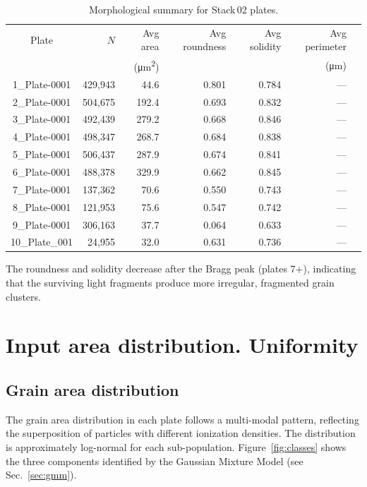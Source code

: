 \documentclass[12pt,a4paper]{article}
\begin{document}
\begin{table}[H]
\centering
\caption{Morphological summary for Stack\,02 plates.}
\label{tab:morph}
\begin{tabular}{crrrrrc}
\toprule
Plate & $N$ & Avg area & Avg roundness & Avg solidity &
Avg perimeter \\
 & & (\si{\micro\meter\squared}) & & & (\si{\micro\meter}) \\
\midrule
1\_Plate-0001 & 429,943 & 44.6 & 0.801 & 0.784 & --- \\
2\_Plate-0001 & 504,675 & 192.4 & 0.693 & 0.832 & --- \\
3\_Plate-0001 & 492,439 & 279.2 & 0.668 & 0.846 & --- \\
4\_Plate-0001 & 498,347 & 268.7 & 0.684 & 0.838 & --- \\
5\_Plate-0001 & 506,437 & 287.9 & 0.674 & 0.841 & --- \\
6\_Plate-0001 & 488,378 & 329.9 & 0.662 & 0.845 & --- \\
7\_Plate-0001 & 137,362 & 70.6 & 0.550 & 0.743 & --- \\
8\_Plate-0001 & 121,953 & 75.6 & 0.547 & 0.742 & --- \\
9\_Plate-0001 & 306,163 & 37.7 & 0.064 & 0.633 & --- \\
10\_Plate\_001 & 24,955 & 32.0 & 0.631 & 0.736 & --- \\
\bottomrule
\end{tabular}
\end{table}

The roundness and solidity decrease after the Bragg peak (plates 7+),
indicating that the surviving light fragments produce more irregular,
fragmented grain clusters.

\section{Input area distribution. Uniformity}
\label{sec:uniformity}

\subsection{Grain area distribution}

The grain area distribution in each plate follows a multi-modal pattern,
reflecting the superposition of particles with different ionization
densities. The distribution is approximately log-normal for each
sub-population. Figure~\ref{fig:classes} shows the three components
identified by the Gaussian Mixture Model (see Sec.~\ref{sec:gmm}).
\end{document}
